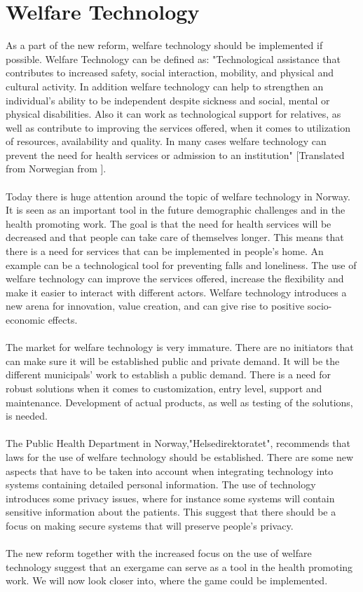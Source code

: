 \section{Welfare Technology}
As a part of the new reform, welfare technology should be implemented if possible. Welfare Technology can be defined as: "Technological assistance that contributes to increased safety, social interaction, mobility, and physical and cultural activity. In addition welfare technology can help to strengthen an individual’s ability to be independent despite sickness and social, mental or physical disabilities. Also it can work as technological support for relatives, as well as contribute to improving the services offered, when it comes to utilization of resources, availability and quality. In many cases welfare technology can prevent the need for health services or admission to an institution" [Translated from Norwegian from \cite{welfare}].\\ \\
Today there is huge attention around the topic of welfare technology in Norway. It is seen as an important tool in the future demographic challenges and in the health promoting work.  The goal is that the need for health services will be decreased and that people can take care of themselves longer. This means that there is a need for services that can be implemented in people’s home. An example can be a technological tool for preventing falls and loneliness.  The use of welfare technology can improve the services offered, increase the flexibility and make it easier to interact with different actors. Welfare technology introduces a new arena for innovation, value creation, and can give rise to positive socio-economic effects. \\ \\
The market for welfare technology is very immature. There are no initiators that can make sure it will be established public and private demand. It will be the different municipals' work to establish a public demand. There is a need for robust solutions when it comes to customization, entry level, support and maintenance. Development of actual products, as well as testing of the solutions, is needed. \\ \\
The Public Health Department in Norway,"Helsedirektoratet", recommends that laws for the use of welfare technology should be established. There are some new aspects that have to be taken into account when integrating technology into systems containing detailed personal information. The use of technology introduces some privacy issues, where for instance some systems will contain  sensitive information about the patients. This suggest that there should be a focus on making secure systems that will preserve people’s privacy.\cite{welfare} \\ \\
The new reform together with the increased focus on the use of welfare technology suggest that an exergame can serve as a tool in the health promoting work. We will now look closer into, where the game could be implemented.

